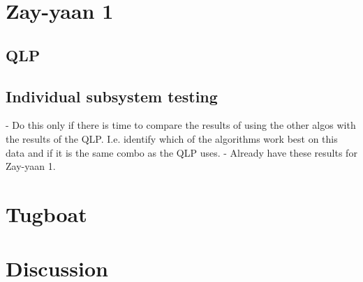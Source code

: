 \documentclass[class=report,11pt,crop=false]{standalone}
\begin{document}
\section{Zay-yaan 1}
\subsection{QLP}

\subsection{Individual subsystem testing}
- Do this only if there is time to compare the results of using the other algos with the results of the QLP. I.e. identify which of the algorithms work best on this data and if it is the same combo as the QLP uses. 
- Already have these results for Zay-yaan 1.

\section{Tugboat}

\section{Discussion}

\ifstandalone

\printnoidxglossary[type=\acronymtype,nonumberlist]
\fi
\end{document}
